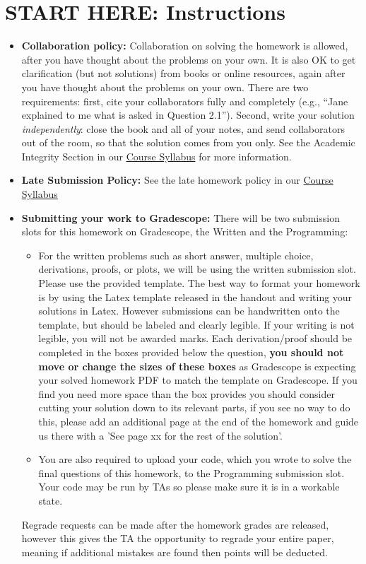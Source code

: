 \documentclass{article}
\begin{document}
\section*{START HERE: Instructions}
\begin{itemize}
\item \textbf{Collaboration policy:} Collaboration on solving the homework is allowed, after you have thought about the problems on your own. It is also OK to get clarification (but not solutions) from books or online resources, again after you have thought about the problems on your own. There are two requirements: first, cite your collaborators fully and completely (e.g., ``Jane explained to me what is asked in Question 2.1''). Second, write your solution {\em independently}: close the book and all of your notes, and send collaborators out of the room, so that the solution comes from you only. See the Academic Integrity Section in our \href{\currentsyllabus}{Course Syllabus} for more information.

\item\textbf{Late Submission Policy:} See the late homework policy in our \href{\currentsyllabus}{Course Syllabus}

\item\textbf{Submitting your work to Gradescope:} There will be two submission slots for this homework on Gradescope, the Written and the Programming:

\begin{itemize}

\item For the written problems such as short answer, multiple choice, derivations, proofs, or plots, we will be using the written submission slot. Please use the provided template. The best way to format your homework is by using the Latex template released in the handout and writing your solutions in Latex. However submissions can be handwritten onto the template, but should be labeled and clearly legible. If your writing is not legible, you will not be awarded marks.  Each derivation/proof should be  completed in the boxes provided below the question, \textbf{you should not move or change the sizes of these boxes} as Gradescope is expecting your solved homework PDF to match the template on Gradescope. If you find you need more space than the box provides you should consider cutting your solution down to its relevant parts, if you see no way to do this, please add an additional page at the end of the homework and guide us there with a 'See page xx for the rest of the solution'.
\item You are also required to upload your code, which you wrote to solve the final questions of this homework, to the Programming submission slot. Your code may be run by TAs so please make sure it is in a workable state.

\end{itemize}
Regrade requests can be made after the homework grades are released, however this gives the TA the opportunity to regrade your entire paper, meaning if additional mistakes are found then points will be deducted. 
\end{itemize}
\end{document}
